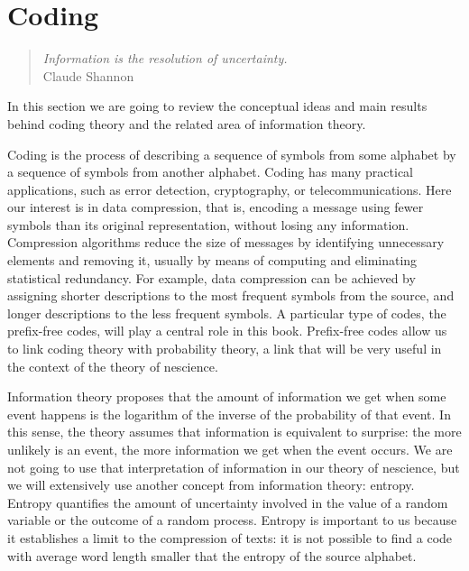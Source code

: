 %
%


\chapter{Coding}
\label{chap:Coding}

\begin{quote}
\begin{flushright}
\emph{Information is the resolution of uncertainty.}\\
Claude Shannon
\end{flushright}
\end{quote}
\bigskip

In this section we are going to review the conceptual ideas and main results behind coding theory and the related area of information theory.

Coding is the process of describing a sequence of symbols from some alphabet by a sequence of symbols from another alphabet. Coding has many practical applications, such as error detection, cryptography, or telecommunications. Here our interest is in data compression, that is, encoding a message using fewer symbols than its original representation, without losing any information. Compression algorithms reduce the size of messages by identifying unnecessary elements and removing it, usually by means of computing and eliminating statistical redundancy. For example, data compression can be achieved by assigning shorter descriptions to the most frequent symbols from the source, and longer descriptions to the less frequent symbols. A particular type of codes, the prefix-free codes, will play a central role in this book. Prefix-free codes allow us to link coding theory with probability theory, a link that will be very useful in the context of the theory of nescience.

Information theory proposes that the amount of information we get when some event happens is the logarithm of the inverse of the probability of that event. In this sense, the theory assumes that information is equivalent to surprise: the more unlikely is an event, the more information we get when the event occurs. We are not going to use that interpretation of information in our theory of nescience, but we will extensively use another concept from information theory: entropy. Entropy quantifies the amount of uncertainty involved in the value of a random variable or the outcome of a random process. Entropy is important to us because it establishes a limit to the compression of texts: it is not possible to find a code with average word length smaller that the entropy of the source alphabet.

